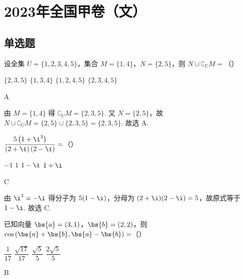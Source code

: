 \chapter{2023年全国甲卷（文）}

\section{单选题}

\begin{problem}
设全集 \(U=\{1,2,3,4,5\}\)，集合 \(M=\{1,4\}\)，\(N=\{2,5\}\)，则 \(N\cup\complement_U M=\)（\quad）

\choices
    {\(\{2,3,5\}\)}
    {\(\{1,3,4\}\)}
    {\(\{1,2,4,5\}\)}
    {\(\{2,3,4,5\}\)}
\end{problem}

\begin{answer}
A
\end{answer}

\begin{solution}
由 \(M=\{1,4\}\) 得 \(\complement_U M=\{2,3,5\}\). 又 \(N=\{2,5\}\)，故 \(N\cup\complement_U M=\{2,5\}\cup\{2,3,5\}=\{2,3,5\}\). 故选 A.
\end{solution}

\begin{problem}
\(\dfrac{5\left(1+\i^3\right)}{\left(2+\i\right)\left(2-\i\right)}=\)（\quad）

\choices
    {\(-1\)}
    {\(1\)}
    {\(1-\i\)}
    {\(1+\i\)}
\end{problem}

\begin{answer}
C
\end{answer}

\begin{solution}
由 \(\i^3=-\i\) 得分子为 \(5(1-\i)\)，分母为 \((2+\i)(2-\i)=5\)，故原式等于 \(1-\i\). 故选 C.
\end{solution}

\begin{problem}
已知向量 \(\bs{a}=\left(3,1\right)\)，\(\bs{b}=\left(2,2\right)\)，则 \(\cos\left(\bs{a}+\bs{b},\bs{a}-\bs{b}\right)=\)（\quad）

\choices
    {\(\dfrac{1}{17}\)}
    {\(\dfrac{\sqrt{17}}{17}\)}
    {\(\dfrac{\sqrt{5}}{5}\)}
    {\(\dfrac{2\sqrt{5}}{5}\)}
\end{problem}

\begin{answer}
B
\end{answer}

